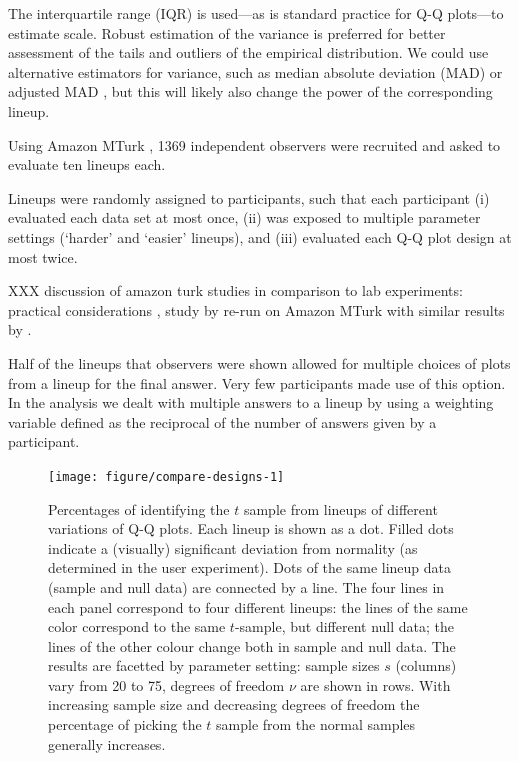 \documentclass{article}\usepackage[]{graphicx}\usepackage[]{color}
\newenvironment{knitrout}{}{} %
\newcommand{\hh}[1]{{\color{magenta} #1}}
\begin{document}
The interquartile range (IQR) is used---as is standard practice for Q-Q plots---to estimate scale. Robust estimation of the variance is preferred for better assessment of the tails and outliers of the empirical distribution. We could use alternative estimators for variance, such as median absolute deviation (MAD) or adjusted MAD \citep{rousseeuw}, but this will likely also change the power of the corresponding lineup.

Using  Amazon MTurk \citep{amazon}, 1369 independent observers were recruited and asked to evaluate ten lineups each. \hh{Lineups were randomly assigned to participants, such that each participant
(i) evaluated each data set at most once, 
(ii) was exposed to multiple parameter settings (`harder' and `easier' lineups), and
(iii) evaluated each Q-Q plot design at most twice.

XXX discussion of amazon turk studies in comparison to lab experiments: practical considerations \citep{Kosara:2010}, study by \citet{cleveland:1984} re-run on Amazon MTurk with similar results by \citet{Heer:2010}.
}
%
Half of the lineups that observers were shown allowed for multiple choices of plots from a lineup for the final answer. Very few participants made use of this option. In the analysis we dealt with multiple answers to a lineup by using a weighting variable defined as the reciprocal of the number of answers given by a participant.





\begin{figure}[ht]
\centering
\begin{knitrout}
\color{fgcolor}
\texttt{[image: figure/compare-designs-1]} 

\end{knitrout}
\caption{\label{fig:compare} \hh{Percentages of identifying the $t$ sample from lineups of different variations of Q-Q plots. Each lineup is shown as a dot. Filled dots indicate a (visually) significant deviation from normality (as determined in the user experiment). Dots of the same lineup data (sample and null data) are connected by a line.
The four lines in each panel correspond to four different lineups: the lines of the same color correspond to the same $t$-sample, but different null data; the lines of the other colour change both in sample and null data. The results are facetted by parameter setting: sample sizes $s$ (columns) vary from 20 to 75, degrees of freedom $\nu$ are shown in rows. With increasing sample size and decreasing degrees of freedom the percentage of picking the $t$ sample  from the normal samples generally increases. }
 }
\end{figure}
\afterpage{\clearpage}
\end{document}
